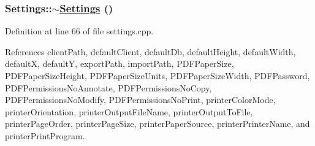 \hypertarget{classSettings_d1}{
\subsubsection[$\sim$Settings]{\setlength{\rightskip}{0pt plus 5cm}Settings::$\sim$\hyperlink{classSettings}{Settings} ()}}
\label{classSettings_d1}


Definition at line 66 of file settings.cpp.

References client\-Path, default\-Client, default\-Db, default\-Height, default\-Width, default\-X, default\-Y, export\-Path, import\-Path, PDFPaper\-Size, PDFPaper\-Size\-Height, PDFPaper\-Size\-Units, PDFPaper\-Size\-Width, PDFPassword, PDFPermissions\-No\-Annotate, PDFPermissions\-No\-Copy, PDFPermissions\-No\-Modify, PDFPermissions\-No\-Print, printer\-Color\-Mode, printer\-Orientation, printer\-Output\-File\-Name, printer\-Output\-To\-File, printer\-Page\-Order, printer\-Page\-Size, printer\-Paper\-Source, printer\-Printer\-Name, and printer\-Print\-Program.

